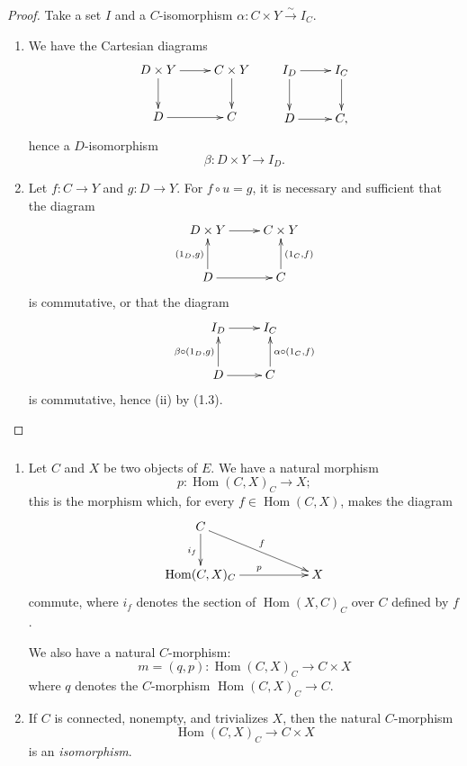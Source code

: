 \documentclass[10pt,oneside]{amsart}
\newcommand{\oldpage}[1]{\marginnote{\textbf{#1}}}
\DeclareMathOperator{\Hom}{Hom}
\begin{document}
\begin{proof}
Take a set $I$ and a $C$-isomorphism $\alpha:C\times Y\xrightarrow{\sim}I_C$.
\begin{enumerate}[label=(\roman*)]
  \item We have the Cartesian diagrams
    \[
      \xymatrix{
        D\times Y\ar[r]\ar[d] & C\times Y\ar[d]\\
        D\ar[r] & C
      }
      \qquad
      \xymatrix{
        I_D\ar[r]\ar[d] & I_C\ar[d]\\
        D\ar[r] & C,
      }
    \]
    hence a $D$-isomorphism
    \[
      \beta:D\times Y\longrightarrow I_D.
    \]
  \item Let $f:C\to Y$ and $g:D\to Y$.
    For $f\circ u=g$, it is necessary and sufficient that the diagram
    \[
      \xymatrix{
        D\times Y\ar[r] & C\times Y\\
        D\ar[u]^{(1_D,g)}\ar[r] & C\ar[u]_{(1_C,f)}
      }
    \]
    \oldpage{6} is commutative, or that the diagram
    \[
      \xymatrix{
        I_D\ar[r] & I_C\\
        D\ar[u]^{\beta\circ(1_D,g)}\ar[r] & C\ar[u]_{\alpha\circ(1_C,f)}
      }
    \]
    is commutative, hence (ii) by (1.3).
\end{enumerate}
\end{proof}

\subsubsection{}
\begin{enumerate}[label=(\roman*)]
  \item Let $C$ and $X$ be two objects of $E$.
    We have a natural morphism
    \[
      p:\Hom(C,X)_C\longrightarrow X;
    \]
    this is the morphism which, for every $f\in\Hom(C,X)$, makes the diagram
    \[
      \xymatrix{
        C\ar[rrd]^f\ar[d]_{i_f}\\
        \Hom(C,X)_C\ar[rr]^p & & X
      }
    \]
    commute, where $i_f$ denotes the section of $\Hom(X,C)_C$ over $C$ defined by $f$.

    We also have a natural $C$-morphism:
    \[
      m=(q,p):\Hom(C,X)_C\longrightarrow C\times X
    \]
    where $q$ denotes the $C$-morphism $\Hom(C,X)_C\to C$.
  \item If $C$ is connected, nonempty, and trivializes $X$, then the natural $C$-morphism
    \[
      \Hom(C,X)_C\longrightarrow C\times X
    \]
    is an \emph{isomorphism}.
\end{enumerate}
\end{document}
